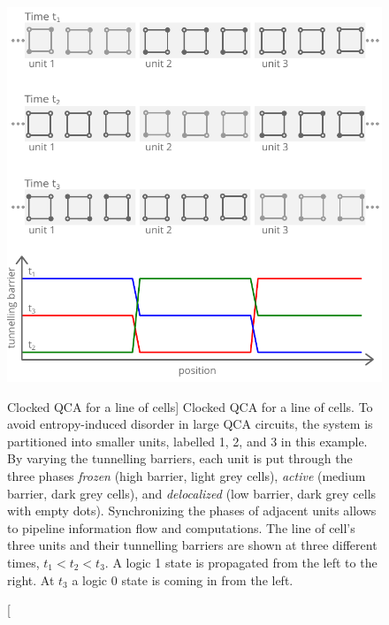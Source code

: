 \begin{figure}
  \center
  \includegraphics{clocking}
  \caption
[Clocked QCA for a line of cells]
{
Clocked QCA for a line of cells. To avoid entropy-induced disorder in large QCA
circuits, the system is partitioned into smaller units, labelled 1, 2, and 3 in
this example. By varying the tunnelling barriers, each unit is put through the
three phases \emph{frozen} (high barrier, light grey cells), \emph{active}
(medium barrier, dark grey cells), and \emph{delocalized} (low barrier, dark
grey cells with empty dots). Synchronizing the phases of adjacent units allows
to pipeline information flow and computations. The line of cell's three units
and their tunnelling barriers are shown at three different times, $t_1<t_2<t_3$.
A logic 1 state is propagated from the left to the right. At $t_3$ a logic 0
state is coming in from the left.
}
  \label{fig:clocking}
\end{figure}

